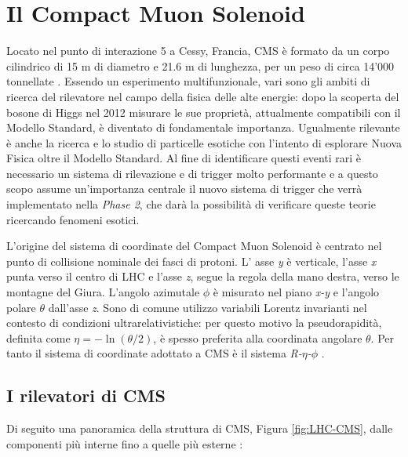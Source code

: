 \section{Il Compact Muon Solenoid}  
\label{sec:CMSDescrizione}

Locato nel punto di interazione 5 a Cessy, Francia, CMS è formato da un corpo cilindrico di 15 m di diametro e 21.6 m di lunghezza, per un peso di circa 14'000 tonnellate \cite{cms2008cms}. Essendo un esperimento multifunzionale, vari sono gli ambiti di ricerca del rilevatore nel campo della fisica delle alte energie: dopo la scoperta del bosone di Higgs nel 2012 misurare le sue proprietà, attualmente compatibili con il Modello Standard, è diventato di fondamentale importanza. Ugualmente rilevante è anche la ricerca e lo studio di particelle esotiche con l'intento di esplorare Nuova Fisica oltre il Modello Standard. Al fine di identificare questi eventi rari è necessario un sistema di rilevazione e di trigger molto performante \cite{sirunyan2020performance} e a questo scopo assume un'importanza centrale il nuovo sistema di trigger che verrà implementato nella \textit{Phase 2}, che darà la possibilità di verificare queste teorie ricercando fenomeni esotici.

L'origine del sistema di coordinate del Compact Muon Solenoid è centrato nel punto di collisione nominale dei fasci di protoni. L' asse \textit{y} è verticale, l'asse \textit{x} punta verso il centro di LHC e l'asse \textit{z}, segue la regola della mano destra, verso le montagne del Giura. L'angolo azimutale $\phi$ è misurato nel piano \textit{x-y} e l'angolo polare $\theta$ dall'asse \textit{z}. Sono di comune utilizzo variabili Lorentz invarianti nel contesto di condizioni ultrarelativistiche: per questo motivo la pseudorapidità, definita come $\eta = -\ln\left(\theta/2\right)$, è spesso preferita alla coordinata angolare $\theta$. Per tanto il sistema di coordinate adottato a CMS è il sistema \textit{R-$\eta$-$\phi$} \cite{Quertenmont:2010ota}.

\subsection{I rilevatori di CMS}

Di seguito una panoramica della struttura di CMS, Figura \ref{fig:LHC-CMS}, dalle componenti più interne fino a quelle più esterne \cite{MasterThesisNicLai}:

